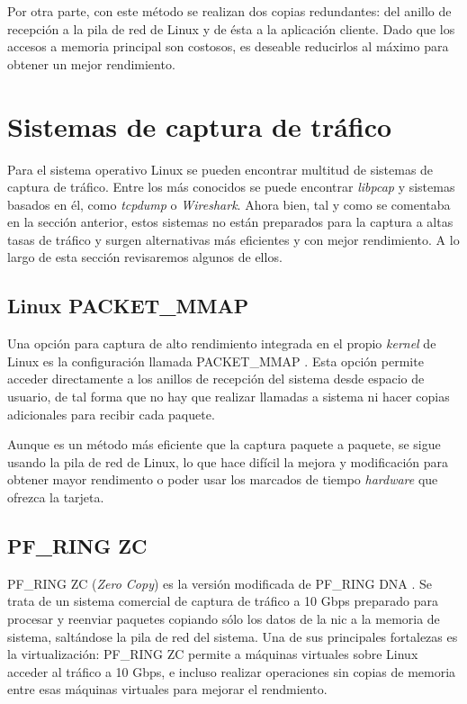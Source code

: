 \documentclass[twoside, 12pt]{epstfg}
\begin{document}
Por otra parte, con este método se realizan dos copias redundantes: del anillo de recepción a la pila de red de Linux y de ésta a la aplicación cliente. Dado que los accesos a memoria principal son costosos, es deseable reducirlos al máximo para obtener un mejor rendimiento.

\section{Sistemas de captura de tráfico}

Para el sistema operativo Linux se pueden encontrar multitud de sistemas de captura de tráfico. Entre los más conocidos se puede encontrar \textit{libpcap} y sistemas basados en él, como \textit{tcpdump} o \textit{Wireshark}. Ahora bien, tal y como se comentaba en la sección anterior, estos sistemas no están preparados para la captura a altas tasas de tráfico y surgen alternativas más eficientes y con mejor rendimiento. A lo largo de esta sección revisaremos algunos de ellos.

\subsection{Linux PACKET\_MMAP}

Una opción para captura de alto rendimiento integrada en el propio \textit{kernel} de Linux es la configuración llamada PACKET\_MMAP \cite{packetmmap}. Esta opción permite acceder directamente a los anillos de recepción del sistema desde espacio de usuario, de tal forma que no hay que realizar llamadas a sistema ni hacer copias adicionales para recibir cada paquete.

Aunque es un método más eficiente que la captura paquete a paquete, se sigue usando la pila de red de Linux, lo que hace difícil la mejora y modificación para obtener mayor rendimento o poder usar los marcados de tiempo \textit{hardware} que ofrezca la tarjeta.

\subsection{PF\_RING ZC}

PF\_RING ZC (\textit{Zero Copy}) es la versión modificada de PF\_RING DNA \cite{rizzo201210}. Se trata de un sistema comercial de captura de tráfico a 10 Gbps preparado para procesar y reenviar paquetes copiando sólo los datos de la \gls{nic} a la memoria de sistema, saltándose la pila de red del sistema. Una de sus principales fortalezas es la virtualización: PF\_RING ZC permite a máquinas virtuales sobre Linux acceder al tráfico a 10 Gbps, e incluso realizar operaciones sin copias de memoria entre esas máquinas virtuales para mejorar el rendmiento.
\end{document}
